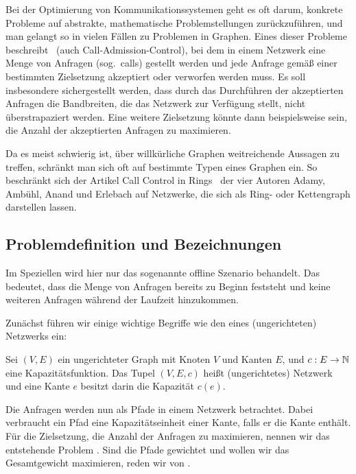Bei der Optimierung von Kommunikationssystemen geht es oft darum, konkrete Probleme auf abstrakte, mathematische 
Problemstellungen zurückzuführen, und man gelangt so in vielen Fällen zu Problemen in Graphen.
Eines dieser Probleme beschreibt \CallControl\ (auch Call-Admission-Control), bei dem
in einem Netzwerk eine Menge von Anfragen (sog.\ calls) gestellt werden und jede Anfrage gemäß einer bestimmten Zielsetzung
akzeptiert oder verworfen werden muss.
Es soll insbesondere sichergestellt werden, dass durch das Durchführen der akzeptierten Anfragen die Bandbreiten,
die das Netzwerk zur Verfügung stellt, nicht überstrapaziert werden.
Eine weitere Zielsetzung könnte dann beispielsweise sein, die Anzahl der akzeptierten Anfragen zu maximieren.

Da es meist schwierig ist, über willkürliche Graphen weitreichende Aussagen zu treffen, schränkt
man sich oft auf bestimmte Typen eines Graphen ein.
So beschränkt sich der Artikel \glqq Call Control in Rings\grqq\ \cite{paper} der vier Autoren Adamy, Ambühl, Anand und Erlebach auf Netzwerke,
die sich als Ring- oder Kettengraph darstellen lassen.

\subsection{Problemdefinition und Bezeichnungen}
Im Speziellen wird hier nur das sogenannte offline Szenario behandelt.
Das bedeutet, dass die Menge von Anfragen bereits zu Beginn feststeht und keine weiteren Anfragen während der
Laufzeit hinzukommen.

Zunächst führen wir einige wichtige Begriffe wie den eines (ungerichteten) Netzwerks ein:

\begin{definition}[Netzwerk]
	Sei $(V,E)$ ein ungerichteter Graph mit Knoten $V$ und Kanten $E$, und $c: E \to \mathbb N$ eine Kapazitätsfunktion.
	Das Tupel $(V,E,c)$ heißt (ungerichtetes) Netzwerk und eine Kante $e$ besitzt darin die Kapazität $c(e)$.
\end{definition}

Die Anfragen werden nun als Pfade in einem Netzwerk betrachtet.
Dabei verbraucht ein Pfad eine Kapazitätseinheit einer Kante, falls er die Kante enthält.
Für die Zielsetzung, die Anzahl der Anfragen zu maximieren, nennen wir das entstehende Problem \CallControl.
Sind die Pfade gewichtet und wollen wir das Gesamtgewicht maximieren, reden wir von \WeightedCallControl.

